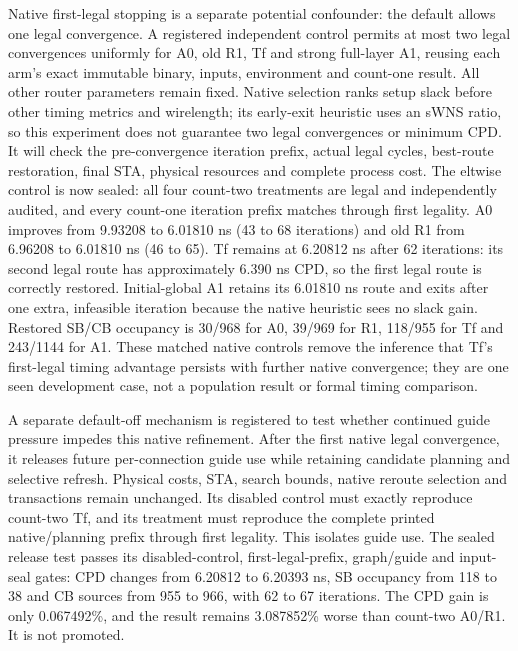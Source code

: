 \documentclass[conference,10pt]{IEEEtran}
\begin{document}
Native first-legal stopping is a separate potential confounder: the default allows one legal convergence. A registered independent control permits at most two legal convergences uniformly for A0, old R1, Tf and strong full-layer A1, reusing each arm's exact immutable binary, inputs, environment and count-one result. All other router parameters remain fixed. Native selection ranks setup slack before other timing metrics and wirelength; its early-exit heuristic uses an sWNS ratio, so this experiment does not guarantee two legal convergences or minimum CPD. It will check the pre-convergence iteration prefix, actual legal cycles, best-route restoration, final STA, physical resources and complete process cost. The eltwise control is now sealed: all four count-two treatments are legal and independently audited, and every count-one iteration prefix matches through first legality. A0 improves from 9.93208 to 6.01810 ns (43 to 68 iterations) and old R1 from 6.96208 to 6.01810 ns (46 to 65). Tf remains at 6.20812 ns after 62 iterations: its second legal route has approximately 6.390 ns CPD, so the first legal route is correctly restored. Initial-global A1 retains its 6.01810 ns route and exits after one extra, infeasible iteration because the native heuristic sees no slack gain. Restored SB/CB occupancy is 30/968 for A0, 39/969 for R1, 118/955 for Tf and 243/1144 for A1. These matched native controls remove the inference that Tf's first-legal timing advantage persists with further native convergence; they are one seen development case, not a population result or formal timing comparison.

A separate default-off mechanism is registered to test whether continued guide pressure impedes this native refinement. After the first native legal convergence, it releases future per-connection guide use while retaining candidate planning and selective refresh. Physical costs, STA, search bounds, native reroute selection and transactions remain unchanged. Its disabled control must exactly reproduce count-two Tf, and its treatment must reproduce the complete printed native/planning prefix through first legality. This isolates guide use. The sealed release test passes its disabled-control, first-legal-prefix, graph/guide and input-seal gates: CPD changes from 6.20812 to 6.20393 ns, SB occupancy from 118 to 38 and CB sources from 955 to 966, with 62 to 67 iterations. The CPD gain is only 0.067492\%, and the result remains 3.087852\% worse than count-two A0/R1. It is not promoted.
\end{document}
